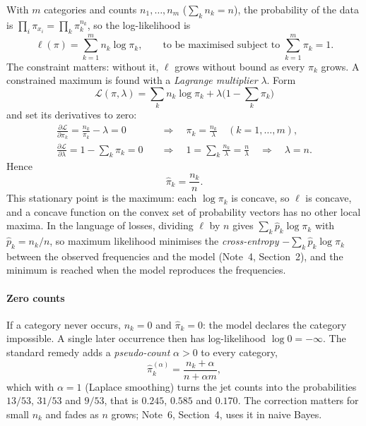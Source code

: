 \documentclass[11pt]{article}
\begin{document}
With $m$ categories and counts $n_1, \dots, n_m$ ($\sum_k n_k = n$), the probability of the data is
$\prod_i \pi_{x_i} = \prod_k \pi_k^{n_k}$, so the log-likelihood is
\[
  \ell(\pi) = \sum_{k=1}^m n_k \log \pi_k, \qquad \text{to be maximised subject to } \sum_{k=1}^m \pi_k = 1 .
\]
The constraint matters: without it, $\ell$ grows without bound as every $\pi_k$ grows. A constrained maximum is found
with a \emph{Lagrange multiplier} $\lambda$. Form
\[
  \mathcal{L}(\pi, \lambda) = \sum_k n_k \log\pi_k + \lambda\Big(1 - \sum_k \pi_k\Big)
\]
and set its derivatives to zero:
\begin{align*}
  \frac{\partial\mathcal{L}}{\partial\pi_k} = \frac{n_k}{\pi_k} - \lambda = 0
  &\quad\Longrightarrow\quad \pi_k = \frac{n_k}{\lambda} \quad (k = 1, \dots, m), \\
  \frac{\partial\mathcal{L}}{\partial\lambda} = 1 - \sum_k \pi_k = 0
  &\quad\Longrightarrow\quad 1 = \sum_k \frac{n_k}{\lambda} = \frac{n}{\lambda}
  \quad\Longrightarrow\quad \lambda = n .
\end{align*}
Hence
\begin{equation}\label{eq:catmle}
  \hat\pi_k = \frac{n_k}{n} .
\end{equation}
This stationary point is the maximum: each $\log\pi_k$ is concave, so $\ell$ is concave, and a concave function on the
convex set of probability vectors has no other local maxima. In the language of losses, dividing $\ell$ by $n$ gives
$\sum_k \hat p_k \log\pi_k$ with $\hat p_k = n_k/n$, so maximum likelihood minimises the \emph{cross-entropy}
$-\sum_k \hat p_k \log\pi_k$ between the observed frequencies and the model (Note~4, Section~2), and the minimum is
reached when the model reproduces the frequencies.

\paragraph{Zero counts} If a category never occurs, $n_k = 0$ and $\hat\pi_k = 0$: the model declares the category
impossible. A single later occurrence then has log-likelihood $\log 0 = -\infty$. The standard remedy adds a
\emph{pseudo-count} $\alpha > 0$ to every category,
\begin{equation}\label{eq:pseudocount}
  \hat\pi_k^{(\alpha)} = \frac{n_k + \alpha}{n + \alpha m},
\end{equation}
which with $\alpha = 1$ (Laplace smoothing) turns the jet counts into the probabilities $13/53$, $31/53$ and $9/53$,
that is $0.245$, $0.585$ and $0.170$. The correction matters for small $n_k$ and fades as $n$ grows; Note~6, Section~4, uses it in naive Bayes.
\end{document}
